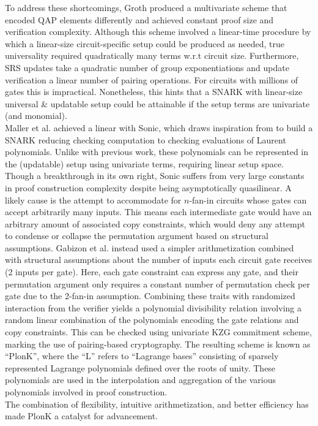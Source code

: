 \noindent To address these shortcomings, Groth produced a multivariate scheme that encoded QAP elements differently and achieved constant proof size and verification complexity. Although this scheme involved a linear-time procedure by which a linear-size circuit-specific setup could be produced as needed, true universality required quadratically many terms w.r.t circuit size. Furthermore, SRS updates take a quadratic number of group exponentiations and update verification a linear number of pairing operations. For circuits with millions of gates this is impractical. Nonetheless, this hints that a SNARK with linear-size universal \& updatable setup could be attainable if the setup terms are univariate (and monomial).\\

\noindent Maller et al. achieved a linear with Sonic, which draws inspiration from to build a SNARK reducing checking computation to checking evaluations of Laurent polynomials. Unlike with previous work, these polynomials can be represented in the (updatable) setup using univariate terms, requiring linear setup space. Though a breakthrough in its own right, Sonic suffers from very large constants in proof construction complexity despite being asymptotically quasilinear. A likely cause is the attempt to accommodate for $n$-fan-in circuits whose gates can accept arbitrarily many inputs. This means each intermediate gate would have an arbitrary amount of associated copy constraints, which would deny any attempt to condense or collapse the permutation argument based on structural assumptions. Gabizon et al. instead used a simpler arithmetization combined with structural assumptions about the number of inputs each circuit gate receives (2 inputs per gate). Here, each gate constraint can express any gate, and their permutation argument only requires a constant number of permutation check per gate due to the 2-fan-in assumption. Combining these traits with randomized interaction from the verifier yields a polynomial divisibility relation involving a random linear combination of the polynomials encoding the gate relations and copy constraints. This can be checked using univariate KZG commitment scheme, marking the use of pairing-based cryptography. The resulting scheme is known as ``PlonK'', where the ``L'' refers to ``Lagrange bases'' consisting of sparsely represented Lagrange polynomials defined over the roots of unity. These polynomials are used in the interpolation and aggregation of the various polynomials involved in proof construction.\\

\noindent The combination of flexibility, intuitive arithmetization, and better efficiency has made PlonK a catalyst for advancement.
